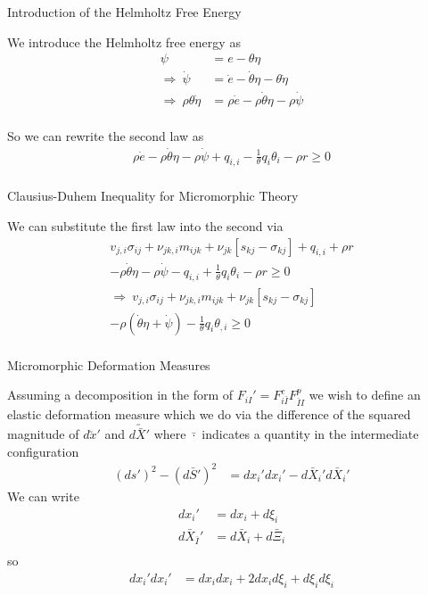 \documentclass[11pt]{beamer}
\newcommand{\VEC}[1]{\utilde{#1}}
\begin{document}
\begin{frame}{Introduction of the Helmholtz Free Energy}

We introduce the Helmholtz free energy as
\begin{align*}
\psi &= e - \theta \eta\\
\Rightarrow\ \dot{\psi} &= \dot{e} - \dot{\theta} \eta - \theta \dot{\eta}\\
\Rightarrow\ \rho \theta \dot{\eta} &= \rho \dot{e} - \rho \dot{\theta} \eta - \rho \dot{\psi}\\
\end{align*}

So we can rewrite the second law as
\begin{align*}
\rho \dot{e} - \rho \dot{\theta} \eta - \rho \dot{\psi} + q_{i,i} - \frac{1}{\theta} q_i \theta_i - \rho r \geq 0\\
\end{align*}

\end{frame}

\begin{frame}{Clausius-Duhem Inequality for Micromorphic Theory}

We can substitute the first law into the second via
\begin{align*}
v_{j,i} \sigma_{ij} + \nu_{jk,i} m_{ijk} + \nu_{jk}\left[s_{kj} - \sigma_{kj}\right] + q_{i,i} + \rho r\\ - \rho \dot{\theta} \eta - \rho \dot{\psi} - q_{i,i} + \frac{1}{\theta} q_i \theta_i - \rho r \geq 0\\
\Rightarrow\ v_{j,i} \sigma_{ij} + \nu_{jk,i} m_{ijk} + \nu_{jk}\left[s_{kj} - \sigma_{kj}\right]\\ - \rho \left(\dot{\theta} \eta + \dot{\psi}\right) - \frac{1}{\theta} q_i \theta_{,i}\geq 0\\
\end{align*}



\end{frame}

\begin{frame}{Micromorphic Deformation Measures}

Assuming a decomposition in the form of $F_{iI}' = F_{i\bar{I}}^eF_{\bar{I}I}^p$ we wish to define an elastic deformation measure which we do via the difference of the  squared magnitude of $d\VEC{x}'$ and $d\VEC{\bar{X}}'$ where $\bar{\cdot}$ indicates a quantity in the intermediate configuration
\begin{align*}
\left(ds'\right)^2 - \left(d\bar{S}'\right)^2 &= dx_i' dx_i' - d\bar{X}_i' d\bar{X}_i'
\end{align*} We can write
\begin{align*}
dx_i' &= dx_i + d\xi_i\\
d\bar{X}_{\bar{I}}' &= d\bar{X}_i + d\bar{\Xi}_i\\
\end{align*} so \begin{align*}
dx_i' dx_i' &= dx_i dx_i + 2 dx_i d\xi_i + d\xi_i d\xi_i\\
\end{align*}

\end{frame}
\end{document}
